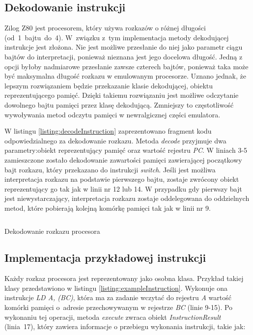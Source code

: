 \subsection{Dekodowanie instrukcji}
Zilog Z80 jest procesorem, który używa rozkazów o różnej długości \mbox{(od 1 bajtu do 4)}. W~związku z~tym implementacja metody dekodującej instrukcje jest złożona. Nie jest możliwe przesłanie do niej jako parametr ciągu bajtów do interpretacji, ponieważ nieznana jest jego docelowa długość. Jedną z opcji byłoby nadmiarowe przesłanie zawsze czterech bajtów, ponieważ taka może być maksymalna długość rozkazu w emulowanym procesorze. Uznano jednak, że lepszym rozwiązaniem będzie przekazanie klasie dekodującej, obiektu reprezentującego pamięć. Dzięki takiemu rozwiązaniu jest możliwe odczytanie dowolnego bajtu pamięci przez klasę dekodującą.
Zmniejszy to częstotliwość wywoływania metod odczytu pamięci w newralgicznej części emulatora. 

W listingu \ref{listing:decodeInstruction} zaprezentowano fragment kodu odpowiedzialnego za dekodowanie rozkazu. Metoda \emph{decode} przyjmuje dwa parametry:obiekt reprezentujący pamięć oraz wartość rejestru \emph{PC}. W liniach 3-5 zamieszczone zostało dekodowanie zawartości pamięci zawierającej początkowy bajt rozkazu, który przekazano do instrukcji \emph{switch}. Jeśli jest możliwa interpretacja rozkazu na podstawie pierwszego bajtu, zostaje zwrócony obiekt reprezentujący go tak jak w linii nr 12 lub 14. W przypadku gdy pierwszy bajt jest niewystarczający, interpretacja rozkazu zostaje oddelegowana do oddzielnych metod, które pobierają kolejną komórkę pamięci tak jak w linii nr 9.  

\begin{listing}[h]
	\inputminted{java}{listings/z80emu-core/decodeInstruction.java}
	\caption{Dekodowanie rozkazu procesora}
	\label{listing:decodeInstruction}
\end{listing}

\subsection{Implementacja przykładowej instrukcji}
Każdy rozkaz procesora jest reprezentowany jako osobna klasa. Przykład takiej klasy przedstawiono w listingu \ref{listing:exampleInstruction}. Wykonuje ona instrukcje \emph{LD A, (BC)}, która ma za zadanie wczytać do rejestru \emph{A} wartość komórki pamięci o~adresie przechowywanym w rejestrze \emph{BC} (linie 9-15). Po wykonaniu tej operacji, metoda \emph{execute} zwraca obiekt \mbox{\emph{InstructionResult}} (linia~17), który zawiera informacje o przebiegu wykonania instrukcji, takie jak:

